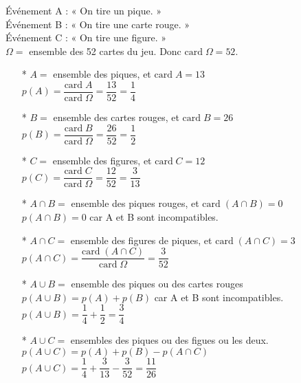 Événement A : « On tire un pique. » \\
Événement B : « On tire une carte rouge. » \\
Événement C : « On tire une figure. » \\

$\Omega =$ ensemble des 52 cartes du jeu. Donc $\mathrm{card} \; \Omega = 52$. 

\begin{itemize}
\item[*] $A = $ ensemble des piques, et $\mathrm{card} \; A = 13$ \\ $p\left(A\right) = \dfrac{\mathrm{card} \; A}{\mathrm{card} \; \Omega} = \dfrac{13}{52} = \dfrac{1}{4} $ \\
\item[*] $B = $ ensemble des cartes rouges, et $\mathrm{card} \; B = 26$ \\ $p\left(B\right) = \dfrac{\mathrm{card} \; B}{\mathrm{card} \; \Omega} = \dfrac{26}{52} = \dfrac{1}{2} $ \\
\item[*] $C = $ ensemble des figures, et $\mathrm{card} \; C = 12$ \\ $p\left(C\right) = \dfrac{\mathrm{card} \; C}{\mathrm{card} \; \Omega} = \dfrac{12}{52} = \dfrac{3}{13} $ \\
\item[*] $A\cap B = $ ensemble des piques rouges, et $\mathrm{card} \; \left(A \cap B\right) = 0$ \\ $p\left(A \cap B\right) = 0$ car A et B sont incompatibles. \\
\item[*] $A \cap C = $ ensemble des figures de piques, et $\mathrm{card} \; \left(A \cap C\right) = 3$ \\ $p\left(A \cap C \right) = \dfrac{ \mathrm{card} \; \left(A \cap C\right)}{\mathrm{card} \; \Omega} = \dfrac{3}{52} $ \\
\item[*] $A \cup B = $ ensemble des piques ou des cartes rouges \\ $p\left(A \cup B\right) = p\left(A\right) + p\left(B\right)$ car A et B sont incompatibles. \\ $p\left(A \cup B\right) = \dfrac{1}{4} + \dfrac{1}{2} = \dfrac{3}{4} $ \\
\item[*]  $ A \cup C =$ ensembles des piques ou des figues ou les deux. \\ $p\left(A \cup C\right) = p\left(A\right) + p\left(B\right) - p\left(A \cap C\right) $ \\ $p\left(A \cup C\right) = \dfrac{1}{4} + \dfrac{3}{13} - \dfrac{3}{52} = \dfrac{11}{26} $ \\
\end{itemize}

